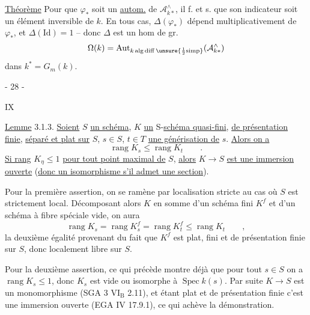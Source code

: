 \uline{Théorème} Pour que $\varphi_*$ soit un \uline{autom.}
de $\mathcal A_{k*}^\wedge$, il f. et s. que son indicateur
soit un élément inversible de $k$. En tous cas, $\Delta(\varphi_*)$ dépend multiplicativement
de $\varphi_*$, et $\Delta(\mathrm{Id})=1$ -- donc $\Delta$ est un hom de gr.
\[
 \Omega(k)=\operatorname{Aut}_{k\,\mathrm{alg}\,\mathrm{diff}\,\unsure{\frac12\mathrm{simp}}}(\mathcal A_{k*}^\wedge)
\]
dans $k^*=G_m(k)$.
\begin{center}- 28 -\end{center}\hfill IX

\uline{Lemme} 3.1.3. \uline{Soient} $S$ \uline{un schéma}, $K$ \uline{un} S-\uline{schéma quasi-fini}, \uline{de présentation finie}, \uline{séparé et plat sur} $S$, $s\in S$, $t\in T$ \uline{une générisation de} $s$.
\uline{Alors on a}
\[
 \operatorname{rang}K_s\leq\operatorname{rang}K_t\qquad.
\]
\uline{Si rang} $K_\eta\leq1$ \uline{pour tout point maximal de} $S$, \uline{alors}
$K\longrightarrow S$ \uline{est une immersion ouverte} (\uline{donc un isomorphisme s'il admet une section}).

Pour la première assertion, on se ramène par localisation
stricte au cas où $S$ est strictement local. Décomposant alors $K$ en
somme d'un schéma fini $K^f$ et d'un schéma à fibre spéciale vide, on
aura
\[
 \operatorname{rang}K_s=\operatorname{rang}K_s^f=\operatorname{rang}K_t^f
 \leq\operatorname{rang}K_t\qquad,
\]
la deuxième égalité provenant du fait que $K^f$ est plat, fini et de
présentation finie sur $S$, donc localement libre sur $S$.

Pour la deuxième assertion, ce qui précède montre déjà que
pour tout $s\in S$ on a $\operatorname{rang}K_s\leq1$, donc $K_s$ est vide ou isomorphe à
$\operatorname{Spec}k(s)$. Par suite $K\longrightarrow S$ est un monomorphisme (SGA 3 $\mathrm{VI_B}$ 2.11),
et étant plat et de présentation finie c'est une immersion ouverte
(EGA IV 17.9.1), ce qui achève la démonstration.


